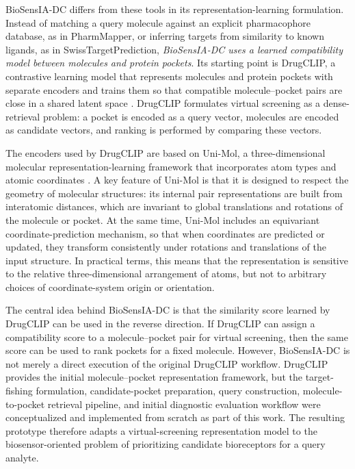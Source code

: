 \documentclass[12pt,fleqn]{article}
\begin{document}
BioSensIA-DC differs from these tools in its representation-learning
formulation. Instead of matching a query molecule against an explicit
pharmacophore database, as in PharmMapper, or inferring targets from
similarity to known ligands, as in SwissTargetPrediction, \emph{BioSensIA-DC
uses a learned compatibility model between molecules and protein
pockets}. Its starting point is DrugCLIP, a contrastive learning model
that represents molecules and protein pockets with separate encoders
and trains them so that compatible molecule--pocket pairs are close in
a shared latent space \citep{gao23:_drugc}. DrugCLIP formulates
virtual screening as a dense-retrieval problem: a pocket is encoded as
a query vector, molecules are encoded as candidate vectors, and
ranking is performed by comparing these vectors.


The encoders used by DrugCLIP are based on Uni-Mol, a
three-dimensional molecular representation-learning framework that
incorporates atom types and atomic coordinates
\citep{zhou23:_uni_mol}. A key feature of Uni-Mol is that it is
designed to respect the geometry of molecular structures: its internal
pair representations are built from interatomic distances, which are
invariant to global translations and rotations of the molecule or
pocket. At the same time, Uni-Mol includes an equivariant
coordinate-prediction mechanism, so that when coordinates are
predicted or updated, they transform consistently under rotations and
translations of the input structure. In practical terms, this means
that the representation is sensitive to the relative three-dimensional
arrangement of atoms, but not to arbitrary choices of
coordinate-system origin or orientation. 

The central idea behind BioSensIA-DC is that the similarity score
learned by DrugCLIP can be used in the reverse direction. If DrugCLIP
can assign a compatibility score to a molecule--pocket pair for
virtual screening, then the same score can be used to rank pockets for
a fixed molecule. However, BioSensIA-DC is not merely a direct
execution of the original DrugCLIP workflow. DrugCLIP provides the
initial molecule--pocket representation framework, but the
target-fishing formulation, candidate-pocket preparation, query
construction, molecule-to-pocket retrieval pipeline, and initial
diagnostic evaluation workflow were conceptualized and implemented
from scratch as part of this work. The resulting prototype therefore
adapts a virtual-screening representation model to the
biosensor-oriented problem of prioritizing candidate bioreceptors for
a query analyte.
\end{document}
